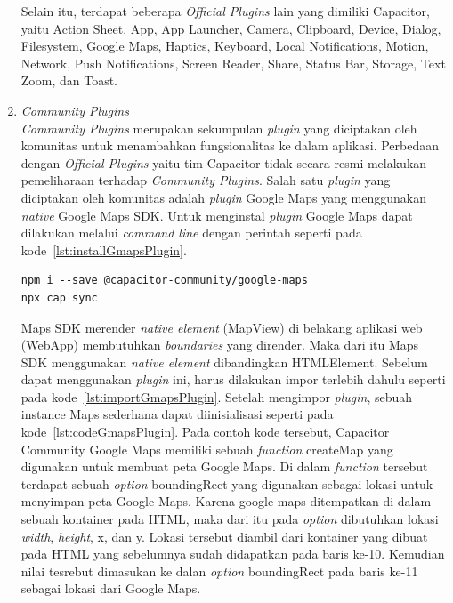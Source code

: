 \begin{enumerate}
\begin{enumerate}
		\end{enumerate}				
		
		Selain itu, terdapat beberapa \textit{Official Plugins} lain yang dimiliki Capacitor, yaitu Action Sheet, App, App Launcher, Camera, Clipboard, Device, Dialog, Filesystem, Google Maps, Haptics, Keyboard, Local Notifications, Motion, Network, Push Notifications, Screen Reader, Share, Status Bar, Storage, Text Zoom, dan Toast.
		\newpage
	\item \textit{Community Plugins} \\
		\textit{Community Plugins} merupakan sekumpulan \textit{plugin} yang diciptakan oleh komunitas untuk menambahkan fungsionalitas ke dalam aplikasi. Perbedaan dengan \textit{Official Plugins} yaitu tim Capacitor tidak secara resmi melakukan pemeliharaan terhadap \textit{Community Plugins}. Salah satu \textit{plugin} yang diciptakan oleh komunitas adalah \textit{plugin }Google Maps yang menggunakan \textit{native} Google Maps SDK. Untuk menginstal \textit{plugin} Google Maps dapat dilakukan melalui \textit{command line} dengan perintah seperti pada kode~\ref{lst:installGmapsPlugin}.	
		
\begin{lstlisting}[label={lst:installGmapsPlugin}, caption=Kode untuk Menginstal \textit{Plugin} Google Maps]
npm i --save @capacitor-community/google-maps
npx cap sync
\end{lstlisting}

	Maps SDK merender \textit{native element} (MapView) di belakang aplikasi web (WebApp) membutuhkan \textit{boundaries} yang dirender. Maka dari itu Maps SDK menggunakan \textit{native element} dibandingkan HTMLElement. Sebelum dapat menggunakan \textit{plugin} ini, harus dilakukan impor terlebih dahulu seperti pada kode~\ref{lst:importGmapsPlugin}. Setelah mengimpor \textit{plugin}, sebuah instance Maps sederhana dapat diinisialisasi seperti pada kode~\ref{lst:codeGmapsPlugin}. Pada contoh kode tersebut, Capacitor Community Google Maps memiliki sebuah \textit{function} createMap yang digunakan untuk membuat peta Google Maps. Di dalam \textit{function} tersebut terdapat sebuah \textit{option} boundingRect yang digunakan sebagai lokasi untuk menyimpan peta Google Maps. Karena google maps ditempatkan di dalam sebuah kontainer pada HTML, maka dari itu pada \textit{option} dibutuhkan lokasi \textit{width}, \textit{height}, x, dan y. Lokasi tersebut diambil dari kontainer yang dibuat pada HTML yang sebelumnya sudah didapatkan pada baris ke-10. Kemudian nilai tesrebut dimasukan ke dalan \textit{option} boundingRect pada baris ke-11 sebagai lokasi dari Google Maps.
	

\end{enumerate}
